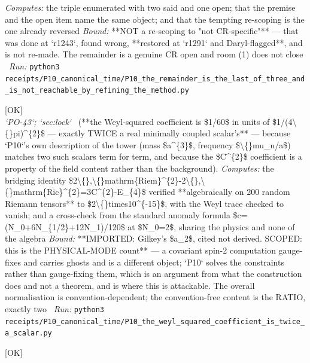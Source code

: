 \begin{description}
\emph{Computes:} the triple enumerated with two said and one open; that the premise and the open item name the same object; and that the tempting re-scoping is the one already reversed
 \emph{Bound:}  **NOT a re-scoping to "not CR-specific"** --- that was done at `r1243`, found wrong, **restored at `r1291` and Daryl-flagged**, and is not re-made. The remainder is a genuine CR open and room (1) does not close
\ \emph{Run:} \texttt{python3 receipts/P10\_canonical\_time/P10\_the\_remainder\_is\_the\_last\_of\_three\_and\_is\_not\_reachable\_by\_refining\_the\_method.py}
\item[\rcptlabel{P10_the_weyl_squared_coefficient_is_twice_a_scalar}{P10R8}\textbf{P10R8}\quad\texttt{P10\_the\_weyl\_squared\_coefficient\_is\_twice\_a\_scalar}]\hfill\textsf{[OK]}\\
\textit{`PO-43`; `sec:lock`} \ (**the Weyl-squared coefficient is \$1/60\$ in units of \$1/(4\textbackslash\{\}pi)\textasciicircum{}\{2\}\$ --- exactly TWICE a real minimally coupled scalar's** --- because `P10`'s own description of the tower (mass \$a\textasciicircum{}\{3\}\$, frequency \$\textbackslash\{\}mu\_n/a\$) matches two such scalars term for term, and because the \$C\textasciicircum{}\{2\}\$ coefficient is a property of the field content rather than the background). 
\emph{Computes:} the bridging identity \$2\textbackslash\{\},\textbackslash\{\}mathrm\{Riem\}\textasciicircum{}\{2\}-2\textbackslash\{\},\textbackslash\{\}mathrm\{Ric\}\textasciicircum{}\{2\}=3C\textasciicircum{}\{2\}-E\_\{4\}\$ verified **algebraically on 200 random Riemann tensors** to \$2\textbackslash\{\}times10\textasciicircum{}\{-15\}\$, with the Weyl trace checked to vanish; and a cross-check from the standard anomaly formula \$c=(N\_0+6N\_\{1/2\}+12N\_1)/120\$ at \$N\_0=2\$, sharing the physics and none of the algebra
 \emph{Bound:} **IMPORTED: Gilkey's \$a\_2\$, cited not derived. SCOPED: this is the PHYSICAL-MODE count** --- a covariant spin-2 computation gauge-fixes and carries ghosts and is a different object; `P10` solves the constraints rather than gauge-fixing them, which is an argument from what the construction does and not a theorem, and is where this is attackable. The overall normalisation is convention-dependent; the convention-free content is the RATIO, exactly two
\ \emph{Run:} \texttt{python3 receipts/P10\_canonical\_time/P10\_the\_weyl\_squared\_coefficient\_is\_twice\_a\_scalar.py}
\item[\rcptlabel{LIFT_adiabatic_correction}{P10R9}\textbf{P10R9}\quad\texttt{LIFT\_adiabatic\_correction}]\hfill\textsf{[OK]}\\

\end{description}
